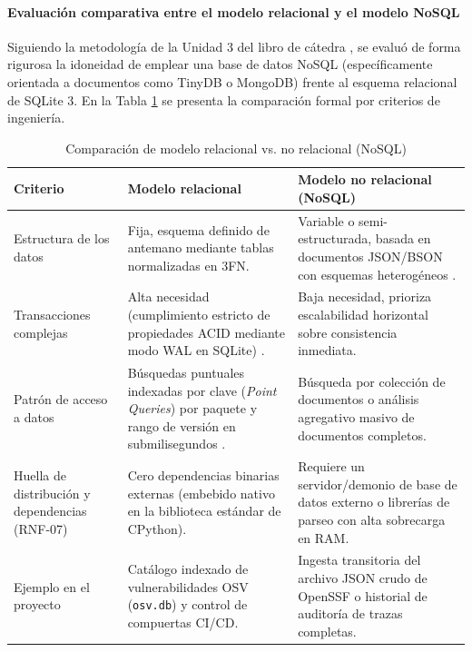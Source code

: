 \paragraph*{Evaluación comparativa entre el modelo relacional y el modelo NoSQL}
Siguiendo la metodología de la Unidad 3 del libro de cátedra \cite{torres2026proyecto}, se evaluó de forma rigurosa la idoneidad de emplear una base de datos NoSQL (específicamente orientada a documentos como TinyDB o MongoDB) frente al esquema relacional de SQLite 3. En la Tabla \ref{p6:tab:evaluacion_nosql} se presenta la comparación formal por criterios de ingeniería.

\begin{table}[H]
\centering
\caption{Comparación de modelo relacional vs. no relacional (NoSQL)}
\label{p6:tab:evaluacion_nosql}
\small
{}
\setlength{\tabcolsep}{4.5pt}
\begin{tabularx}{\textwidth}{>{\raggedright\arraybackslash}p{3.2cm} >{\raggedright\arraybackslash}X >{\raggedright\arraybackslash}X}
\toprule
\textbf{Criterio} & \textbf{Modelo relacional} & \textbf{Modelo no relacional (NoSQL)} \\
\midrule
Estructura de los datos & 
Fija, esquema definido de antemano mediante tablas normalizadas en 3FN. & 
Variable o semi-estructurada, basada en documentos JSON/BSON con esquemas heterogéneos \cite{torres2026proyecto}. \\
\addlinespace
Transacciones complejas & 
Alta necesidad (cumplimiento estricto de propiedades ACID mediante modo WAL en SQLite) \cite{sommerville2016software}. & 
Baja necesidad, prioriza escalabilidad horizontal sobre consistencia inmediata. \\
\addlinespace
Patrón de acceso a datos & 
Búsquedas puntuales indexadas por clave (\textit{Point Queries}) por paquete y rango de versión en submilisegundos \cite{openssf2023osv}. & 
Búsqueda por colección de documentos o análisis agregativo masivo de documentos completos. \\
\addlinespace
Huella de distribución y dependencias (RNF-07) & 
Cero dependencias binarias externas (embebido nativo en la biblioteca estándar de CPython). & 
Requiere un servidor/demonio de base de datos externo o librerías de parseo con alta sobrecarga en RAM. \\
\addlinespace
Ejemplo en el proyecto & 
Catálogo indexado de vulnerabilidades OSV (\texttt{osv.\allowbreak db}) y control de compuertas CI/CD. & 
Ingesta transitoria del archivo JSON crudo de OpenSSF o historial de auditoría de trazas completas. \\
\bottomrule
\end{tabularx}
\end{table}

